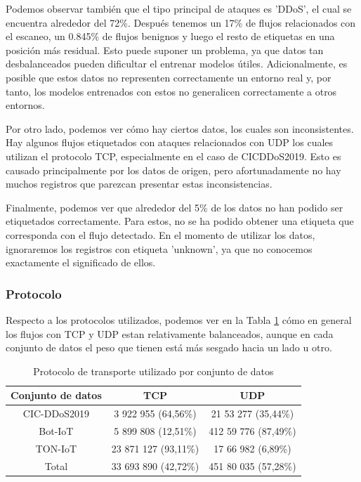 Podemos observar también que el tipo principal de ataques es 'DDoS', el cual se encuentra alrededor del 72\%. Después tenemos un 17\% de flujos relacionados con el escaneo, un 0.845\% de flujos benignos y luego el resto de etiquetas en una posición más residual. Esto puede suponer un problema, ya que datos tan desbalanceados pueden dificultar el entrenar modelos útiles. Adicionalmente, es posible que estos datos no representen correctamente un entorno real y, por tanto, los modelos entrenados con estos no generalicen correctamente a otros entornos.

Por otro lado, podemos ver cómo hay ciertos datos, los cuales son inconsistentes. Hay algunos flujos etiquetados con ataques relacionados con UDP los cuales utilizan el protocolo TCP, especialmente en el caso de CIC\-DDoS2019. Esto es causado principalmente por los datos de origen, pero afortunadamente no hay muchos registros que parezcan presentar estas inconsistencias.

Finalmente, podemos ver que alrededor del 5\% de los datos no han podido ser etiquetados correctamente. Para estos, no se ha podido obtener una etiqueta que corresponda con el flujo detectado. En el momento de utilizar los datos, ignoraremos los registros con etiqueta 'unknown', ya que no conocemos exactamente el significado de ellos.

\subsubsection{Protocolo}

Respecto a los protocolos utilizados, podemos ver en la Tabla \ref{table:packetpincerasprotocols} cómo en general los flujos con TCP y UDP estan relativamente balanceados, aunque en cada conjunto de datos el peso que tienen está más sesgado hacia un lado u otro.

\begin{table}[H]
    \centering
    \begin{tabular}{|c | c c |}
        \hline
        \textbf{Conjunto de datos} & \textbf{TCP}          & \textbf{UDP}         \\  \hline
        CIC-DDoS2019               &  3 922 955  (64,56\%) &  21 53 277 (35,44\%) \\
        Bot-IoT                    &  5 899 808  (12,51\%) & 412 59 776 (87,49\%) \\
        TON-IoT                    & 23 871 127  (93,11\%) &  17 66 982 (6,89\%)  \\
        Total                      & 33 693 890  (42,72\%) & 451 80 035 (57,28\%) \\
        \hline
    \end{tabular}
    \caption{Protocolo de transporte utilizado por conjunto de datos}
    \label{table:packetpincerasprotocols}
\end{table}

